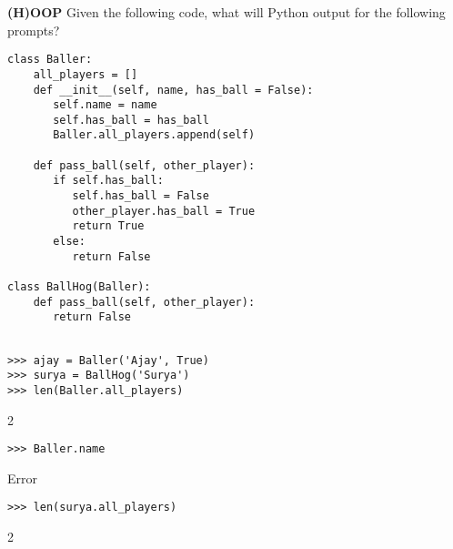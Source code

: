 \begin{blocksection}
\question \textbf{(H)OOP} \newline
Given the following code, what will Python output for the following prompts? 

\begin{lstlisting}
class Baller:
    all_players = []
    def __init__(self, name, has_ball = False):
       self.name = name
       self.has_ball = has_ball
       Baller.all_players.append(self)
    
    def pass_ball(self, other_player):
       if self.has_ball:
          self.has_ball = False
          other_player.has_ball = True
          return True
       else:
          return False

class BallHog(Baller):
    def pass_ball(self, other_player):  
       return False 
       
\end{lstlisting}
\end{blocksection}
\newline
\newline
\newline
\begin{blocksection}

\begin{lstlisting}
>>> ajay = Baller('Ajay', True)
>>> surya = BallHog('Surya')
>>> len(Baller.all_players)
\end{lstlisting}
\begin{solution}[.2in]
2
\end{solution}

\begin{lstlisting}
>>> Baller.name
\end{lstlisting}
\begin{solution}[.2in]
Error
\end{solution}

\begin{lstlisting}
>>> len(surya.all_players)
\end{lstlisting}
\begin{solution}[.2in]
2
\end{solution}
\end{blocksection}

